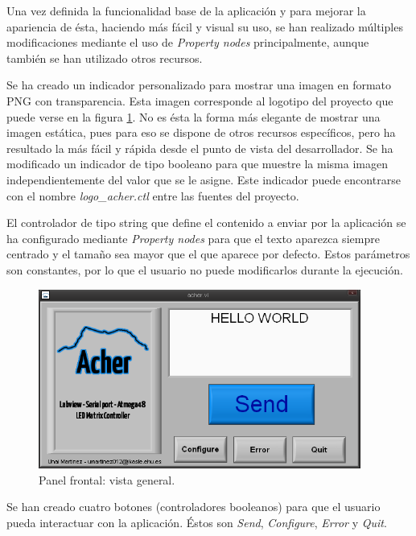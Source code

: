 Una vez definida la funcionalidad base de la aplicación y para mejorar la apariencia de ésta, haciendo más fácil y visual su uso, se han realizado múltiples modificaciones mediante el uso de \textit{Property nodes} principalmente, aunque también se han utilizado otros recursos.

Se ha creado un indicador personalizado\cite{customcontrol} para mostrar una imagen en formato PNG con transparencia. Esta imagen corresponde al logotipo del proyecto que puede verse en la figura \ref{fig:acher_front}. No es ésta la forma más elegante de mostrar una imagen estática, pues para eso se dispone de otros recursos específicos, pero ha resultado la más fácil y rápida desde el punto de vista del desarrollador. Se ha modificado un indicador de tipo booleano para que muestre la misma imagen independientemente del valor que se le asigne. Este indicador puede encontrarse con el nombre \textit{logo\_acher.ctl} entre las fuentes del proyecto.

El controlador de tipo string que define el contenido a enviar por la aplicación se ha configurado mediante \textit{Property nodes} para que el texto aparezca siempre centrado y el tamaño sea mayor que el que aparece por defecto. Estos parámetros son constantes, por lo que el usuario no puede modificarlos durante la ejecución.

\begin{figure}[!htp]
\centering
\includegraphics[width=300pt]{./images/acher_front.png}
\caption{Panel frontal: vista general.}
\label{fig:acher_front}
\end{figure}

Se han creado cuatro botones (controladores booleanos) para que el usuario pueda interactuar con la aplicación. Éstos son \textit{Send}, \textit{Configure}, \textit{Error} y \textit{Quit}.

